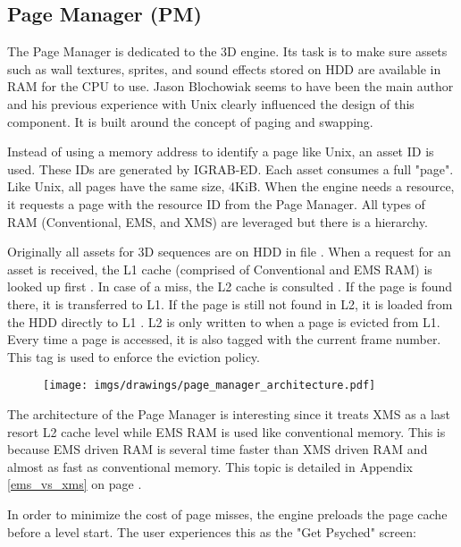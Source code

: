 \documentclass[book.tex]{subfiles}
\begin{document}
\subsection{Page Manager (PM)}
The Page Manager is dedicated to the 3D engine. Its task is to make sure assets such as wall textures, sprites, and sound effects stored on HDD are available in RAM for the CPU to use. Jason Blochowiak seems to have been the main author and his previous experience with Unix clearly influenced the design of this component. It is built around the concept of paging and swapping. \\
\par
Instead of using a memory address to identify a page like Unix, an asset ID is used. These IDs are generated by IGRAB-ED. Each asset consumes a full "page". Like Unix, all pages have the same size, 4KiB. When the engine needs a resource, it requests a page with the resource ID from the Page Manager. All types of RAM (Conventional, EMS, and XMS) are leveraged but there is a hierarchy.\\
\par
Originally all assets for 3D sequences are on HDD in file . When a request for an asset is received, the L1 cache (comprised of Conventional and EMS RAM) is looked up first . In case of a miss, the L2 cache is consulted . If the page is found there, it is transferred to L1. If the page is still not found in L2, it is loaded from the HDD directly to L1 . L2 is only written to when a page is evicted from L1. Every time a page is accessed, it is also tagged with the current frame number. This tag is used to enforce the eviction policy.
 \par
\begin{figure}[H]
\centering
 \texttt{[image: imgs/drawings/page\_manager\_architecture.pdf]}
 \end{figure}
 \par
 The architecture of the Page Manager is interesting since it treats XMS as a last resort L2 cache level while EMS RAM is used like conventional memory. This is because EMS driven RAM is several time faster than XMS driven RAM and almost as fast as conventional memory. This topic is detailed in Appendix \ref{ems_vs_xms} on page \pageref{ems_vs_xms}.\\
 \par
In order to minimize the cost of page misses, the engine preloads the page cache before a level start. The user experiences this as the "Get Psyched" screen:
\end{document}
